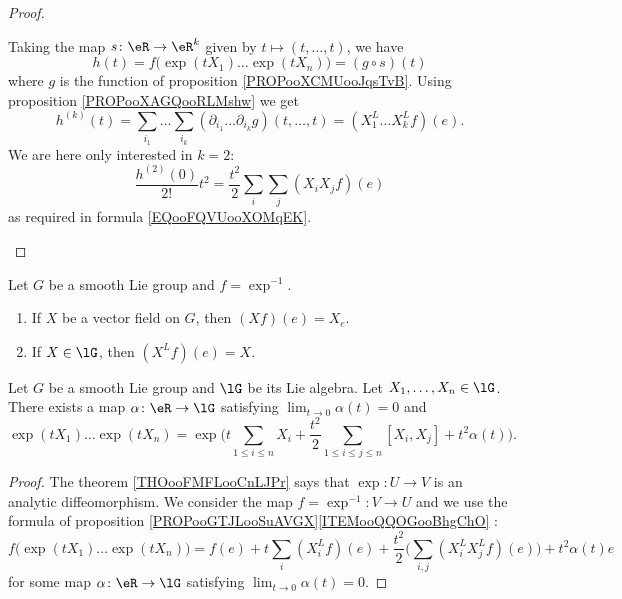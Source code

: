 \begin{theorem}
\begin{proof}
\begin{subproof}
		\spitem[Term \( k=2\)]
		Taking the map \(s \colon \eR\to \eR^k  \) given by \( t\mapsto (t,\ldots,t)\), we have
		\begin{equation}
			h(t)=f\big( \exp(tX_1)\ldots \exp(tX_n) \big)=(g\circ s)(t)
		\end{equation}
		where \( g\) is the function of proposition \ref{PROPooXCMUooJqsTvB}. Using proposition \ref{PROPooXAGQooRLMshw} we get
		\begin{equation}
			h^{(k)}(t)=\sum_{i_1}\ldots \sum_{i_k}(\partial_{i_1}\ldots\partial_{i_k}g)(t,\ldots,t)=(X_1^L\ldots X_k^Lf)(e).
		\end{equation}
		We are here only interested in \( k=2\):
		\begin{equation}
			\frac{ h^{(2)}(0) }{2!}t^2=\frac{ t^2 }{2}\sum_i\sum_j(X_iX_jf)(e)
		\end{equation}
		as required in formula \ref{EQooFQVUooXOMqEK}.
	\end{subproof}
\end{proof}

\begin{lemma}	\label{LEMooVWBIooTxzPIN}
	Let \( G\) be a smooth Lie group and \( f=\exp^{-1}\).
	\begin{enumerate}
		\item
		      If \( X\) be a vector field on \( G\), then \( (Xf)(e)=X_e \).
		\item		\label{ITEMooZCKFooIKbIRx}
		      If \( X\in\lG\), then \( (X^Lf)(e)=X\).
	\end{enumerate}
\end{lemma}


\begin{proposition}	\label{PROPooPTYCooCuHEbO}
	Let \( G\) be a smooth Lie group and \( \lG \) be its Lie algebra. Let \( X_1,\ldots,X_n\in\lG\). There exists a map \(\alpha \colon \eR\to \lG  \) satisfying \( \lim_{t\to 0}\alpha(t)=0\) and
	\begin{equation}
		\exp(tX_1)\ldots \exp(tX_n)=\exp\Big(  t\sum_{1\leq i\leq n}X_i+\frac{ t^2 }{2}\sum_{1\leq i\leq j\leq n}[X_i,X_j]+t^2\alpha(t)   \Big).
	\end{equation}
\end{proposition}

\begin{proof}
	The theorem \ref{THOooFMFLooCnLJPr} says that \(\exp \colon U\to V  \) is an analytic diffeomorphism. We consider the map \(f=\exp^{-1} \colon V\to U  \) and we use the formula of proposition \ref{PROPooGTJLooSuAVGX}\ref{ITEMooQQOGooBhgChO} :
	\begin{equation}
		f\big( \exp(tX_1)\ldots \exp(tX_n) \big)=f(e)+t\sum_i(X_i^Lf)(e)+\frac{ t^2 }{2}\Big( \sum_{i,j}(X^L_iX^L_jf)(e) \Big) + t^2\alpha(t)
		e\end{equation}
	for some map \(\alpha \colon \eR\to \lG  \) satisfying \( \lim_{t\to 0}\alpha(t)=0\).


\end{proof}
\end{theorem}
